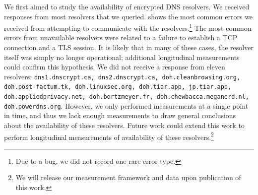 We first aimed to study the availability of encrypted DNS
resolvers. 
We received responses from most resolvers that we queried.  
shows the most common errors we received from attempting to communicate with
the resolvers.\footnote{Due to a bug, we did not record one rare error type.}
The most common errors from unavailable resolvers were related
to a failure to establish a TCP connection and a TLS session.  It is likely
that in many of these cases, the resolver itself was simply no longer
operational; additional longitudinal measurements could confirm this
hypothesis.  We did not receive a response from eleven resolvers:
\texttt{dns1.dnscrypt.ca, dns2.dnscrypt.ca, doh.cleanbrowsing.org,
doh.post-factum.tk, doh.linuxsec.org, doh.tiar.app, jp.tiar.app,
doh.appliedprivacy.net, doh.bortzmeyer.fr, doh.chewbacca.meganerd.nl,
doh.powerdns.org}. However, we only performed measurements at a single point
in time, and thus we lack enough measurements to draw general conclusions
about the availability of these resolvers. Future work could extend this work
to perform longitudinal measurements of availability of these
resolvers.\footnote{We will release our measurement framework and data upon
publication of this work.}


